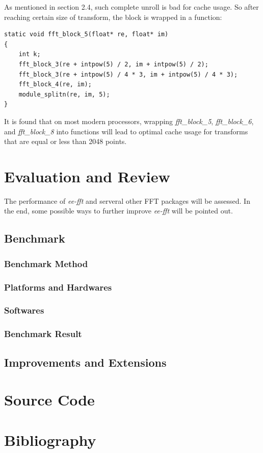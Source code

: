\documentclass[a4paper]{report}
\begin{document}
	As mentioned in section 2.4, such complete unroll is bad for cache usage. So after reaching certain size of transform, the block is wrapped in a function:
	
    \lstset{language = c, tabsize = 4}
    \begin{lstlisting}
static void fft_block_5(float* re, float* im)
{
    int k;
    fft_block_3(re + intpow(5) / 2, im + intpow(5) / 2);
    fft_block_3(re + intpow(5) / 4 * 3, im + intpow(5) / 4 * 3);
    fft_block_4(re, im);
    module_splitn(re, im, 5);
}
    \end{lstlisting}
	
	It is found that on most modern processors, wrapping \textit{fft\_block\_5}, \textit{fft\_block\_6}, and \textit{fft\_block\_8} into functions will lead to optimal cache usage for transforms that are equal or less than 2048 points.

\chapter{Evaluation and Review} \indent

	The performance of \textit{ee-fft} and serveral other FFT packages will be assessed. In the end, some possible ways to further improve \textit{ee-fft} will be pointed out.

\section{Benchmark} \indent

\subsection{Benchmark Method} \indent

\subsection{Platforms and Hardwares} \indent

\subsection{Softwares} \indent

\subsection{Benchmark Result} \indent

\section{Improvements and Extensions} \indent

\appendix
\chapter{Source Code} \indent

\chapter{Bibliography} \indent
\end{document}
